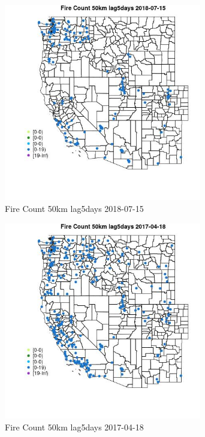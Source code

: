 \begin{figure} 
\centering  
\includegraphics[width=0.77\textwidth]{Code_Outputs/Report_ML_input_PM25_Step4_part_e_de_duplicated_aves_compiled_2019-05-21wNAs_MapObsFire_Count_50km_lag5days2018-07-15.jpg} 
\caption{\label{fig:Report_ML_input_PM25_Step4_part_e_de_duplicated_aves_compiled_2019-05-21wNAsMapObsFire_Count_50km_lag5days2018-07-15}Fire Count 50km lag5days 2018-07-15} 
\end{figure} 
 

\begin{figure} 
\centering  
\includegraphics[width=0.77\textwidth]{Code_Outputs/Report_ML_input_PM25_Step4_part_e_de_duplicated_aves_compiled_2019-05-21wNAs_MapObsFire_Count_50km_lag5days2017-04-18.jpg} 
\caption{\label{fig:Report_ML_input_PM25_Step4_part_e_de_duplicated_aves_compiled_2019-05-21wNAsMapObsFire_Count_50km_lag5days2017-04-18}Fire Count 50km lag5days 2017-04-18} 
\end{figure} 
 

